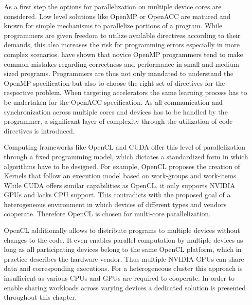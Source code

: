 As a first step the options for parallelization on multiple device cores are considered. Low level solutions like OpenMP or OpenACC are matured and known for simple mechanisms to parallelize portions of a program. While programmers are given freedom to utilize available directives according to their demands, this also increases the risk for programming errors especially in more complex scenarios. \citeauthor{openmp_mistakes} have shown that novice OpenMP programmers tend to make common mistakes regarding correctness and performance in small and medium-sized programs\cite{openmp_mistakes}. Programmers are thus not only mandated to understand the OpenMP specification but also to choose the right set of directives for the respective problem. When targeting accelerators the same learning process has to be undertaken for the OpenACC specification. As all communication and synchronization across multiple cores and devices has to be handled by the programmer, a significant layer of complexity through the utilization of code directives is introduced. 

Computing frameworks like OpenCL and CUDA offer this level of parallelization through a fixed programming model, which dictates a standardized form in which algorithms have to be designed. For example, OpenCL proposes the creation of Kernels that follow an execution model based on work-groups and work-items. While CUDA offers similar capabilities as OpenCL, it only supports NVIDIA GPUs and lacks CPU support. This contradicts with the proposed goal of a heterogeneous environment in which devices of different types and vendors cooperate. Therefore OpenCL is chosen for multi-core parallelization.

OpenCL additionally allows to distribute programs to multiple devices without changes to the code. It even enables parallel computation by multiple devices as long as all participating devices belong to the same OpenCL platform, which in practice describes the hardware vendor. Thus multiple NVIDIA GPUs can share data and corresponding executions. For a heterogeneous cluster this approach is insufficient as various CPUs and GPUs are required to cooperate. In order to enable sharing workloads across varying devices a dedicated solution is presented throughout this chapter.

